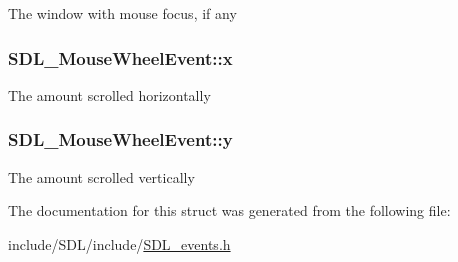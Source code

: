 The window with mouse focus, if any \hypertarget{struct_s_d_l___mouse_wheel_event_a6d904eef474ea45a5b1828fcb5b0f859}{
\subsubsection[{x}]{ S\-D\-L\-\_\-\-Mouse\-Wheel\-Event\-::x}}\label{struct_s_d_l___mouse_wheel_event_a6d904eef474ea45a5b1828fcb5b0f859}
The amount scrolled horizontally \hypertarget{struct_s_d_l___mouse_wheel_event_a53fdf77a464426bc8b30e629795f044b}{
\subsubsection[{y}]{ S\-D\-L\-\_\-\-Mouse\-Wheel\-Event\-::y}}\label{struct_s_d_l___mouse_wheel_event_a53fdf77a464426bc8b30e629795f044b}
The amount scrolled vertically 

The documentation for this struct was generated from the following file\-:\begin{DoxyCompactItemize}
\item 
include/\-S\-D\-L/include/\hyperlink{_s_d_l__events_8h}{S\-D\-L\-\_\-events.\-h}\end{DoxyCompactItemize}
